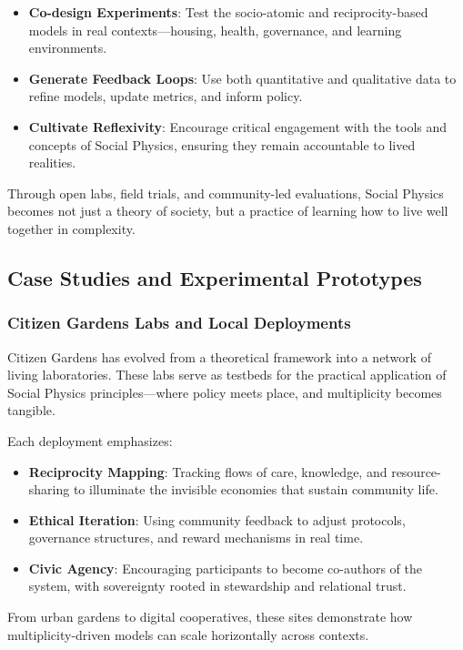\documentclass{article}
\theoremstyle{plain}
\theoremstyle{claimstyle}
\begin{document}
\begin{itemize}
    \item \textbf{Co-design Experiments}: Test the socio-atomic and reciprocity-based models in real contexts—housing, health, governance, and learning environments.
    \item \textbf{Generate Feedback Loops}: Use both quantitative and qualitative data to refine models, update metrics, and inform policy.
    \item \textbf{Cultivate Reflexivity}: Encourage critical engagement with the tools and concepts of Social Physics, ensuring they remain accountable to lived realities.
\end{itemize}

Through open labs, field trials, and community-led evaluations, Social Physics becomes not just a theory of society, but a practice of learning how to live well together in complexity.

\subsection{Case Studies and Experimental Prototypes}

\subsubsection{Citizen Gardens Labs and Local Deployments}

Citizen Gardens has evolved from a theoretical framework into a network of living laboratories. These labs serve as testbeds for the practical application of Social Physics principles—where policy meets place, and multiplicity becomes tangible.

Each deployment emphasizes:

\begin{itemize}
    \item \textbf{Reciprocity Mapping}: Tracking flows of care, knowledge, and resource-sharing to illuminate the invisible economies that sustain community life.
    \item \textbf{Ethical Iteration}: Using community feedback to adjust protocols, governance structures, and reward mechanisms in real time.
    \item \textbf{Civic Agency}: Encouraging participants to become co-authors of the system, with sovereignty rooted in stewardship and relational trust.
\end{itemize}

From urban gardens to digital cooperatives, these sites demonstrate how multiplicity-driven models can scale horizontally across contexts.
\end{document}
